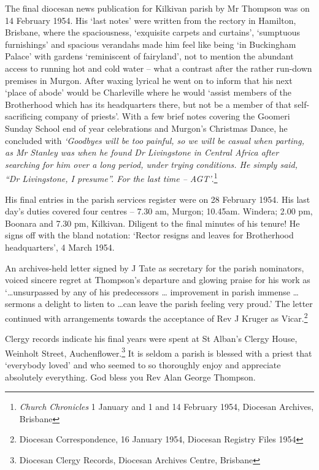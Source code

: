The final diocesan news publication for Kilkivan parish by Mr Thompson was on 14 February 1954. His `last notes' were written from the rectory in Hamilton, Brisbane, where the spaciousness, `exquisite carpets and curtains', `sumptuous furnishings' and spacious verandahs made him feel like being `in Buckingham Palace' with gardens `reminiscent of fairyland', not to mention the abundant access to running hot and cold water -- what a contrast after the rather run-down premises in Murgon. After waxing lyrical he went on to inform that his next `place of abode' would be Charleville where he would `assist members of the Brotherhood which has its headquarters there, but not be a member of that self-sacrificing company of priests'. With a few brief notes covering the Goomeri Sunday School end of year celebrations and Murgon's Christmas Dance, he concluded with \emph{`Goodbyes will be too painful, so we will be casual when parting, as Mr Stanley was when he found Dr Livingstone in Central Africa after searching for him over a long period, under trying conditions. He simply said, ``Dr Livingstone, I presume''. For the last time -- AGT'}.\footnote{\emph{Church Chronicles} 1 January and 1 and 14 February 1954, Diocesan Archives, Brisbane}


His final entries in the parish services register were on 28 February 1954. His last day's duties covered four centres -- 7.30 am, Murgon; 10.45am. Windera; 2.00 pm, Boonara and 7.30 pm, Kilkivan. Diligent to the final minutes of his tenure! He signs off with the bland notation: `Rector resigns and leaves for Brotherhood headquarters', 4 March 1954.



An archives-held letter signed by J Tate as secretary for the parish nominators, voiced sincere regret at Thompson's departure and glowing praise for his work as `\ldots unsurpassed by any of his predecessors \ldots{} improvement in parish immense \ldots{} sermons a delight to listen to \ldots can leave the parish feeling very proud.' The letter continued with arrangements towards the acceptance of Rev J Kruger as Vicar.\footnote{Diocesan Correspondence, 16 January 1954, Diocesan Registry Files 1954}


Clergy records indicate his final years were spent at St Alban's Clergy House, Weinholt Street, Auchenflower.\footnote{Diocesan Clergy Records, Diocesan Archives Centre, Brisbane} It is seldom a parish is blessed with a priest that `everybody loved' and who seemed to so thoroughly enjoy and appreciate absolutely everything. God bless you Rev Alan George Thompson.


